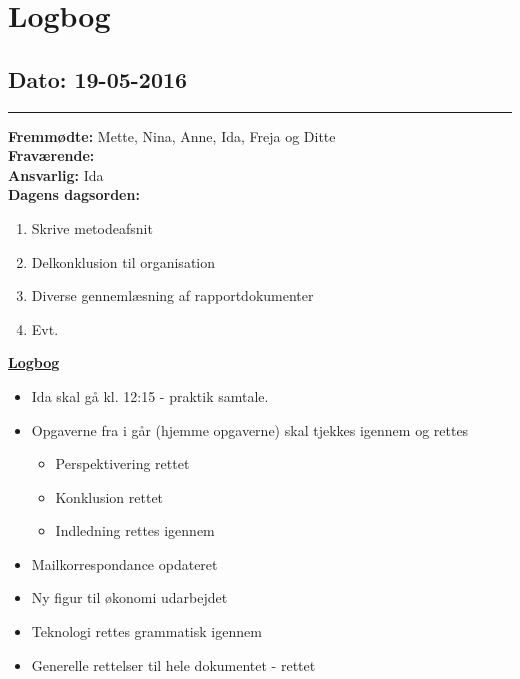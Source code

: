 \chapter{Logbog}
\section{Dato: 19-05-2016}
\hrule
\textbf{Fremmødte: } Mette, Nina, Anne, Ida, Freja og Ditte \\
\textbf{Fraværende:} \\
\textbf{Ansvarlig:} Ida \\
\textbf{Dagens dagsorden: }
\begin{enumerate}
\item Skrive metodeafsnit
\item Delkonklusion til organisation
\item Diverse gennemlæsning af rapportdokumenter
\item Evt.
\end{enumerate}

\underline{\textbf{Logbog}}
\begin{itemize}
\item Ida skal gå kl. 12:15 - praktik samtale.
\item Opgaverne fra i går (hjemme opgaverne) skal tjekkes igennem og rettes
\begin{itemize}
\item Perspektivering rettet
\item Konklusion rettet
\item Indledning rettes igennem
\end{itemize}
\item Mailkorrespondance opdateret
\item Ny figur til økonomi udarbejdet
\item Teknologi rettes grammatisk igennem
\item Generelle rettelser til hele dokumentet - rettet
\end{itemize}

\newpage